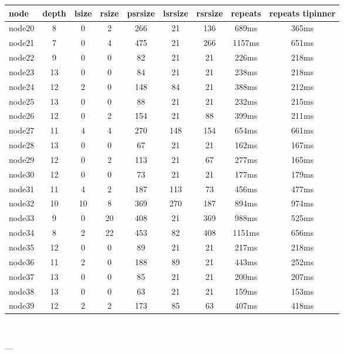 \begin{tabular}{|l|c|c|c|c|c|c|c|c|}
\hline node & depth & lsize & rsize & psrsize & lsrsize & rsrsize   & repeats & repeats tipinner\\
    \hline node20 & 8 & 0 & 2 & 266 & 21 & 136 & 689ms & 365ms\\
    \hline node21 & 7 & 0 & 4 & 475 & 21 & 266 & 1157ms & 651ms\\
    \hline node22 & 9 & 0 & 0 & 82 & 21 & 21 & 226ms & 218ms\\
    \hline node23 & 13 & 0 & 0 & 84 & 21 & 21 & 238ms & 218ms\\
    \hline node24 & 12 & 2 & 0 & 148 & 84 & 21 & 388ms & 212ms\\
    \hline node25 & 13 & 0 & 0 & 88 & 21 & 21 & 232ms & 215ms\\
    \hline node26 & 12 & 0 & 2 & 154 & 21 & 88 & 399ms & 211ms\\
    \hline node27 & 11 & 4 & 4 & 270 & 148 & 154 & 654ms & 661ms\\
    \hline node28 & 13 & 0 & 0 & 67 & 21 & 21 & 162ms & 167ms\\
    \hline node29 & 12 & 0 & 2 & 113 & 21 & 67 & 277ms & 165ms\\
    \hline node30 & 12 & 0 & 0 & 73 & 21 & 21 & 177ms & 179ms\\
    \hline node31 & 11 & 4 & 2 & 187 & 113 & 73 & 456ms & 477ms\\
    \hline node32 & 10 & 10 & 8 & 369 & 270 & 187 & 894ms & 974ms\\
    \hline node33 & 9 & 0 & 20 & 408 & 21 & 369 & 988ms & 525ms\\
    \hline node34 & 8 & 2 & 22 & 453 & 82 & 408 & 1151ms & 656ms\\
    \hline node35 & 12 & 0 & 0 & 89 & 21 & 21 & 217ms & 218ms\\
    \hline node36 & 11 & 2 & 0 & 188 & 89 & 21 & 443ms & 252ms\\
    \hline node37 & 13 & 0 & 0 & 85 & 21 & 21 & 200ms & 207ms\\
    \hline node38 & 13 & 0 & 0 & 63 & 21 & 21 & 159ms & 153ms\\
    \hline node39 & 12 & 2 & 2 & 173 & 85 & 63 & 407ms & 418ms\\

\hline
\end{tabular} \

---


